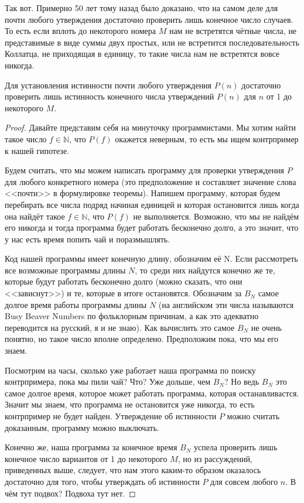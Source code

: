 Так вот. Примерно 50 лет тому назад было доказано, что на самом деле для почти любого утверждения достаточно проверить лишь конечное число случаев. То есть если вплоть до некоторого номера $M$ нам не встретятся чётные числа, не представимые в виде суммы двух простых, или не встретится последовательность Коллатца, не приходящая в единицу, то такие числа нам не встретятся вовсе никогда.

\begin{thm}
Для установления истинности почти любого утверждения $P(n)$ достаточно проверить лишь истинность конечного числа утверждений $P(n)$ для $n$ от 1 до некоторого $M$.
\end{thm}
\begin{proof}
Давайте представим себя на минуточку программистами. Мы хотим найти такое число $f\in\mathbb{N}$, что $P(f)$ окажется неверным, то есть мы ищем контрпример к нашей гипотезе.

Будем считать, что мы можем написать программу для проверки утверждения $P$ для любого конкретного номера (это предположение и составляет значение слова <<почти>> в формулировке теоремы). Напишем программу, которая будем перебирать все числа подряд начиная единицей и которая остановится лишь когда она найдёт такое $f\in\mathbb{N}$, что $P(f)$ не выполняется. Возможно, что мы не найдём его никогда и тогда программа будет работать бесконечно долго, а это значит, что у нас есть время попить чай и поразмышлять.

Код нашей программы имеет конечную длину, обозначим её N. Если рассмотреть все возможные программы длины $N$, то среди них найдутся конечно же те, которые будут работать бесконечно долго (можно сказать, что они <<зависнут>>) и те, которые в итоге остановятся. Обозначим за $B_N$ самое долгое время работы программы длины $N$ (на английском эти числа называются Busy Beaver Numbers по фольклорным причинам, а как это адекватно переводится на русский, я и не знаю). Как вычислить это самое $B_N$ не очень понятно, но такое число вполне определено. Предположим пока, что мы его знаем.

Посмотрим на часы, сколько уже работает наша программа по поиску контрпримера, пока мы пили чай? Что? Уже дольше, чем $B_N$? Но ведь $B_N$ это самое долгое время, которое может работать программа, которая останавливастся. Значит мы знаем, что программа не остановится уже никогда, то есть контрпример не будет найден. Утверждение об истинности $P$ можно считать доказанным, программу можно выключать.

Конечно же, наша программа за конечное время $B_N$ успела проверить лишь конечное число вариантов от 1 до некоторого $M$, но из рассуждений, приведенных выше, следует, что нам этого каким-то образом оказалось достаточно для того, чтобы утверждать об истинности $P$ для совсем любого $n$. В чём тут подвох? Подвоха тут нет. 
\end{proof}

